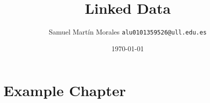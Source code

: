 \documentclass[11pt]{report}
\begin{document}

\title{Linked Data}
\author{Samuel Martín Morales  \texttt{alu0101359526@ull.edu.es}}
\date{\today}

\maketitle

\tableofcontents

\chapter{Example Chapter}
\end{document}
